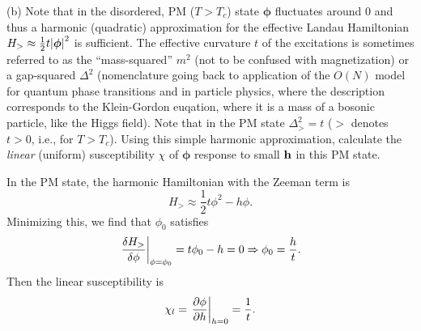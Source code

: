\documentclass[12pt]{article}
\begin{document}
\begin{problem}{4}
(b) Note that in the disordered, PM ($T>T_c$) state $\bm\phi$ fluctuates around
0 and thus a harmonic (quadratic) approximation for the effective Landau
Hamiltonian $H_>\approx\frac12 t\abs{\bm\phi}^2$ is sufficient. The effective
curvature $t$ of the excitations is sometimes referred to as the
``mass-squared'' $m^2$ (not to be confused with magnetization) or a gap-squared
$\Delta^2$ (nomenclature going back to application of the $O(N)$ model for
quantum phase transitions and in particle physics, where the description
corresponds to the Klein-Gordon euqation, where it is a mass of a bosonic
particle, like the Higgs field). Note that in the PM state $\Delta_>^2=t$ ($>$
denotes $t>0$, i.e., for $T>T_c$). Using this simple harmonic approximation,
calculate the \textit{linear} (uniform) susceptibility $\chi$ of $\bm\phi$
response to small $\vb{h}$ in this PM state.
\begin{solution}
In the PM state, the harmonic Hamiltonian with the Zeeman term is
\begin{equation}
    H_>\approx\frac12t\phi^2-h\phi. 
\end{equation}
Minimizing this, we find that $\phi_0$ satisfies
\begin{equation}
    \eval{\frac{\delta H_>}{\delta\phi}}_{\phi=\phi_0}=t\phi_0-h=0 
    \Rightarrow\phi_0=\frac{h}{t}.
\end{equation}
Then the linear susceptibility is
\begin{equation}
    \chi_l=\eval{\frac{\partial\phi}{\partial h}}_{h=0}
    =\frac{1}{t}.
\end{equation}
\end{solution}


\end{problem}
\end{document}
